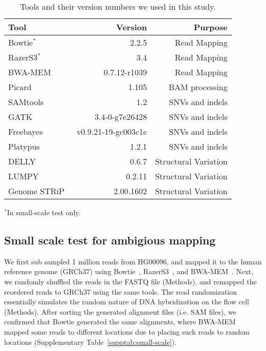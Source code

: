 \documentclass{bioinfo}
\begin{document}
\begin{methods}
\begin{table}[htb]
\caption{Tools and their version numbers we used in this study.}
\begin{center}
\begin{tabular}{|l|r|r|}
\hline
{\bf Tool} & {\bf Version} & {\bf Purpose}\\
\hline
Bowtie$^*$~\citep{Langmead2009} & 2.2.5 & Read Mapping \\
RazerS3$^*$~\citep{Weese2012} & 3.4 & Read Mapping\\
BWA-MEM~\citep{Li2013} & 0.7.12-r1039 & Read Mapping\\
Picard~\citep{picard} & 1.105 & BAM processing\\
SAMtools~~\citep{Li2009b} & 1.2 & SNVs and indels\\
GATK~\citep{DePristo2011} & 3.4-0-g7e26428 & SNVs and indels\\
Freebayes~\citep{Garrison2012} & v0.9.21-19-gc003c1e & SNVs and indels\\
Platypus~\citep{Rimmer2014} & 1.2.1 & SNVs and indels\\
DELLY~\citep{Rausch2012} & 0.6.7 & Structural Variation\\
LUMPY~\citep{Layer2014} & 0.2.11 & Structural Variation\\
Genome STRiP~\citep{Handsaker2011,Handsaker2015} & 2.00.1602 & Structural Variation\\
\hline
\end{tabular}
\end{center}
    {\footnotesize $^*$In small-scale test only.}

\label{tab:tools}
\end{table}

\subsection*{Small scale test for ambigious mapping}
We first sub sampled 1 million reads from HG00096, and mapped it to the human reference genome (GRCh37) using Bowtie~\citep{Langmead2009}, RazerS3~\citep{Weese2012}, %
and BWA-MEM~\citep{Li2009a,Li2013}.
Next, we randomly shuffled the reads in the FASTQ file (Methods), and remapped the reordered reads to GRCh37 using the same tools. The read randomization essentially simulates the random nature of DNA hybridization on the flow cell (Methods).
After sorting the generated alignment files (i.e. SAM files), we confirmed that %
Bowtie generated the same alignments,
where BWA-MEM mapped some reads to different locations due to placing 
such reads to random locations (Supplementary Table~\ref{supptab:small-scale}).


\end{methods}
\end{document}
